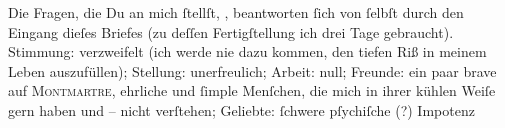 \pstart
            Die Fragen, die Du an mich{ }ſtellſt, \label{K_L02792-25v}\label{K_L02792-25},
               beantworten{ }ſich von{ }ſelbſt durch den Eingang dieſes Briefes {\pb}(zu deſſen Fertigſtellung ich drei Tage gebraucht).
               Stimmung: verzweifelt (ich werde nie dazu kommen, den tiefen Riß in meinem Leben  auszufüllen); Stellung: unerfreulich; Arbeit: null; Freunde: ein paar brave
                  \label{K_L02792-26v}\label{K_L02792-26} auf \textsc{Montmartre}, ehrliche und{ }ſimple Menſchen, die mich in ihrer kühlen Weiſe gern haben und –
               nicht verſtehen; Geliebte:{ }ſchwere pſychiſche (?) Impotenz{\dotsfour}\pend
           
